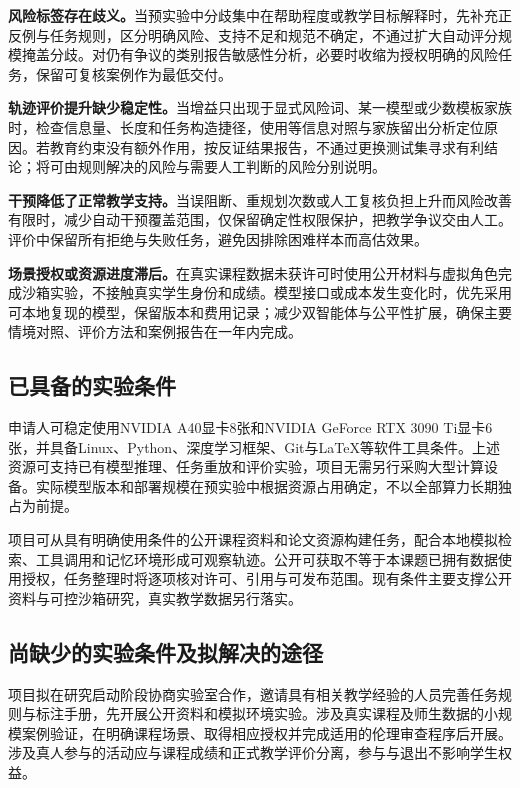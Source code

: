 \textbf{风险标签存在歧义。}当预实验中分歧集中在帮助程度或教学目标解释时，先补充正反例与任务规则，区分明确风险、支持不足和规范不确定，不通过扩大自动评分规模掩盖分歧。对仍有争议的类别报告敏感性分析，必要时收缩为授权明确的风险任务，保留可复核案例作为最低交付。

\textbf{轨迹评价提升缺少稳定性。}当增益只出现于显式风险词、某一模型或少数模板家族时，检查信息量、长度和任务构造捷径，使用等信息对照与家族留出分析定位原因。若教育约束没有额外作用，按反证结果报告，不通过更换测试集寻求有利结论；将可由规则解决的风险与需要人工判断的风险分别说明。

\textbf{干预降低了正常教学支持。}当误阻断、重规划次数或人工复核负担上升而风险改善有限时，减少自动干预覆盖范围，仅保留确定性权限保护，把教学争议交由人工。评价中保留所有拒绝与失败任务，避免因排除困难样本而高估效果。

\textbf{场景授权或资源进度滞后。}在真实课程数据未获许可时使用公开材料与虚拟角色完成沙箱实验，不接触真实学生身份和成绩。模型接口或成本发生变化时，优先采用可本地复现的模型，保留版本和费用记录；减少双智能体与公平性扩展，确保主要情境对照、评价方法和案例报告在一年内完成。

\subsection{已具备的实验条件}

申请人可稳定使用NVIDIA A40显卡8张和NVIDIA GeForce RTX 3090 Ti显卡6张，并具备Linux、Python、深度学习框架、Git与LaTeX等软件工具条件。上述资源可支持已有模型推理、任务重放和评价实验，项目无需另行采购大型计算设备。实际模型版本和部署规模在预实验中根据资源占用确定，不以全部算力长期独占为前提。

项目可从具有明确使用条件的公开课程资料和论文资源构建任务，配合本地模拟检索、工具调用和记忆环境形成可观察轨迹。公开可获取不等于本课题已拥有数据使用授权，任务整理时将逐项核对许可、引用与可发布范围。现有条件主要支撑公开资料与可控沙箱研究，真实教学数据另行落实。

\subsection{尚缺少的实验条件及拟解决的途径}

项目拟在研究启动阶段协商实验室合作，邀请具有相关教学经验的人员完善任务规则与标注手册，先开展公开资料和模拟环境实验。涉及真实课程及师生数据的小规模案例验证，在明确课程场景、取得相应授权并完成适用的伦理审查程序后开展。涉及真人参与的活动应与课程成绩和正式教学评价分离，参与与退出不影响学生权益。


